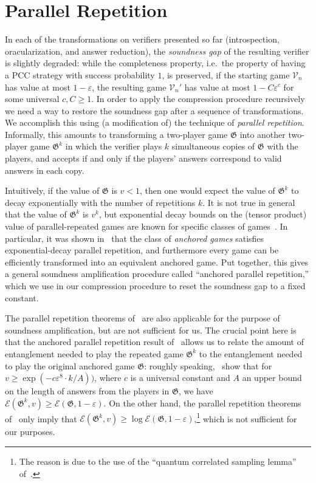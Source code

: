 \documentclass[11pt]{article}
\theoremstyle{definition}
\newcommand{\eps}{\varepsilon}
\newcommand{\game}{\mathfrak{G}}
\newcommand{\verifier}{\mathcal{V}}
\newcommand{\Ent}{\mathscr{E}}
\begin{document}

\section{Parallel Repetition}
\label{sec:parrep}

In each of the transformations on verifiers presented so far (introspection,
oracularization, and answer reduction), the \emph{soundness gap} of the
resulting verifier is slightly degraded: while the completeness property, i.e.\
the property of having a PCC strategy with success probability $1$, is
preserved, if the starting game $\verifier_n$ has value at most $1 - \eps$, the
resulting game $\verifier_n'$ has value at most $1 - C\eps^c$ for some universal
$c,C \geq 1$.
In order to apply the compression procedure recursively we need a way to restore
the soundness gap after a sequence of transformations.
We accomplish this using (a modification of) the technique of \emph{parallel
  repetition}.
Informally, this amounts to transforming a two-player game $\game$ into another
two-player game $\game^k$ in which the verifier plays $k$ simultaneous copies of
$\game$ with the players, and accepts if and only if the players' answers
correspond to valid answers in each copy.

Intuitively, if the value of $\game$ is $v < 1$, then one would expect the value
of $\game^k$ to decay exponentially with the number of repetitions $k$.
It is not true in general that the value of $\game^k$ is $v^k$, but exponential
decay bounds on the (tensor product) value of parallel-repeated games are known
for specific classes of
games~\cite{jain2014parallel,dinur2015parallel,bavarian2017hardness}.
In particular, it was shown in~\cite{bavarian2017hardness} that the class of
\emph{anchored games} satisfies exponential-decay parallel repetition, and
furthermore every game can be efficiently transformed into an equivalent
anchored game.
Put together, this gives a general soundness amplification procedure called
``anchored parallel repetition,'' which we use in our compression procedure to
reset the soundness gap to a fixed constant.

The parallel repetition theorems of~\cite{dinur2015parallel,yuen2016parallel}
are also applicable for the purpose of soundness amplification, but are not
sufficient for us.
The crucial point here is that the anchored parallel repetition result
of~\cite{bavarian2017hardness} allows us to relate the amount of entanglement
needed to play the repeated game $\game^k$ to the entanglement needed to play
the original anchored game $\game$: roughly
speaking,~\cite{bavarian2017hardness} show that for $v\geq \exp(-c\eps^8 \cdot
k/A))$, where $c$ is a universal constant and $A$ an upper bound on the length
of answers from the players in $\game$, we have $\Ent(\game^k,v) \geq
\Ent(\game,1 - \eps)$.
On the other hand, the parallel repetition theorems
of~\cite{dinur2015parallel,yuen2016parallel} only imply that $\Ent(\game^k,v)
\geq \log \Ent(\game,1 - \eps)$,\footnote{The reason is due to the use of the
  ``quantum correlated sampling lemma'' of~\cite{dinur2015parallel}.}
which is not sufficient for our purposes.
\end{document}
